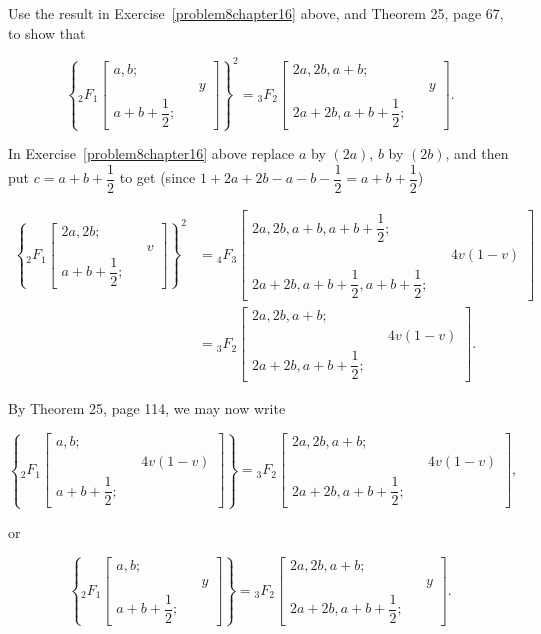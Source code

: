 \begin{problem}\label{problem9chapter16}
Use the result in Exercise~\ref{problem8chapter16} above, and Theorem 25, page 67, to show that

$$\left\{ {}_2F_1 \left[ \begin{array}{rlr}
a,b; & & \\
& & y \\
a+b+\dfrac{1}{2}; & & 
\end{array} \right] \right\}^2 = {}_3F_2 \left[ \begin{array}{rlr}
2a,2b,a+b; & & \\
& & y \\
2a+2b, a+b+\dfrac{1}{2}; & &
\end{array} \right].$$
\end{problem}
\begin{solution}
In Exercise~\ref{problem8chapter16} above replace $a$ by $(2a)$, $b$ by $(2b)$, and then put $c=a+b+\dfrac{1}{2}$ to get (since $1+2a+2b-a-b-\dfrac{1}{2}=a + b + \dfrac{1}{2}$)

$$\begin{array}{ll}
\left\{ {}_2F_1 \left[ \begin{array}{rlr}
2a, 2b; & & \\
& & v \\
a+b+\dfrac{1}{2}; & & 
\end{array} \right] \right\}^2 &= {}_4F_3 \left[ \begin{array}{rlr}
2a,2b,a+b,a+b+\dfrac{1}{2}; & & \\
& & 4v(1-v) \\
2a+2b, a+b +\dfrac{1}{2}, a+b+\dfrac{1}{2}; & & 
\end{array} \right] \\
&= {}_3F_2 \left[ \begin{array}{rlr}
2a,2b,a+b; & & \\
& & 4v(1-v) \\
2a+2b, a+b + \dfrac{1}{2}; & & 
\end{array} \right].
\end{array}$$

By Theorem 25, page 114, we may now write

$$\left\{ {}_2F_1 \left[ \begin{array}{rlr}
a,b; & & \\
& & 4v(1-v) \\
a + b + \dfrac{1}{2}; & & 
\end{array} \right] \right\} = {}_3F_2 \left[ \begin{array}{rlr}
2a, 2b, a+b; & & \\
& & 4v(1-v) \\
2a+2b, a+b+\dfrac{1}{2}; & & 
\end{array} \right],$$

or

$$\left\{ {}_2F_1 \left[ \begin{array}{rlr}
a,b; & & \\
& & y \\
a + b + \dfrac{1}{2}; & & 
\end{array} \right] \right\} = {}_3F_2 \left[ \begin{array}{rlr}
2a, 2b, a+b; & & \\
& & y \\
2a+2b, a+b + \dfrac{1}{2}; & & 
\end{array} \right].$$
\end{solution}